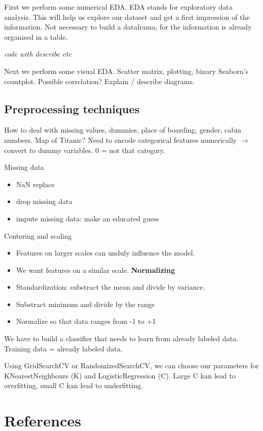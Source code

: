 \documentclass[11pt]{article}
\begin{document}
First we perform some numerical EDA. EDA stands for exploratory data analysis. This will help us explore our dataset and get a first impression of the information. Not necessary to build a dataframa, for the information is already organised in a table. 

\emph{code with describe etc} 

Next we perform some visual EDA. Scatter matrix, plotting, binary Seaborn's countplot. Possible correlation? Explain / describe diagrams. 

\subsection{Preprocessing techniques}
\label{sec:org1644682}

How to deal with missing values, dummies, place of boarding, gender, cabin numbers. Map of Titanic? Need to encode categorical features numerically \(\rightarrow\) convert to dummy variables. 0 = not that category. 

Missing data
\begin{itemize}
\item NaN replace
\item drop missing data
\item impute missing data: make an educated guess
\end{itemize}

Centering and scaling
\begin{itemize}
\item Features on larger scales can unduly influence the model.
\item We want features on a similar scale. \textbf{Normalizing}
\item Standardization: substract the mean and divide by variance.
\item Substract minimum and divide by the range
\item Normalize so that data ranges from -1 to +1
\end{itemize}



We have to build a classifier that needs to learn from already labeled data. Training data = already labeled data.


Using GridSearchCV or RandomizedSearchCV, we can choose our parameters for KNearestNeighbours (K) and LogisticRegression (C). Large C kan lead to overfitting, small C kan lead to underfitting. 


\section{References}
\label{sec:orgafde68a}

\printbibliography
\end{document}
